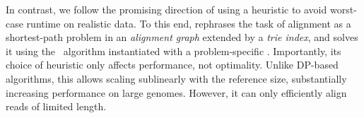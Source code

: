 In contrast, we follow the promising direction of using a heuristic to avoid
worst-case runtime on realistic data. To this end, \astarix rephrases the task
of alignment as a shortest-path problem in an \emph{alignment graph} extended by
a \emph{trie index}, and solves it using the \A~algorithm instantiated with a
problem-specific \prefixh. Importantly, its choice of heuristic only affects
performance, not optimality.
%
Unlike DP-based algorithms, this \prefixh allows scaling sublinearly with the
reference size, substantially increasing performance on large genomes. However,
it can only efficiently align reads of limited length.







